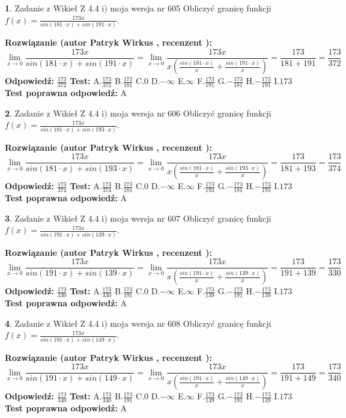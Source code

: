 \documentclass[12pt, a4paper]{article}
\theoremstyle{definition} %
\newtheorem{zad}{}
\newcommand{\zadStart}[1]{\begin{zad}#1\newline}
\newcommand{\zadStop}{\end{zad}}
\newcommand{\rozwStart}[2]{\noindent \textbf{Rozwiązanie (autor #1 , recenzent #2): }\newline}
\newcommand{\rozwStop}{\newline}
\newcommand{\odpStart}{\noindent \textbf{Odpowiedź:}\newline}
\newcommand{\odpStop}{\newline}
\newcommand{\testStart}{\noindent \textbf{Test:}\newline}
\newcommand{\testStop}{\newline}
\newcommand{\kluczStart}{\noindent \textbf{Test poprawna odpowiedź:}\newline}
\newcommand{\kluczStop}{\newline}
\begin{document}
\zadStart{Zadanie z Wikieł Z 4.4 i) moja wersja nr 605}
Obliczyć granicę funkcji $f(x)=\frac{173x}{sin(181\cdot x) +sin(191\cdot x)}$.
\zadStop
\rozwStart{Patryk Wirkus}{}
$$\lim\limits_{x\to 0}\frac{173x}{sin(181\cdot x) +sin(191\cdot x)}=\lim\limits_{x\to 0}\frac{173x}{x(\frac{sin(181\cdot x)}{x}+\frac{sin(191\cdot x)}{x})}=\frac{173}{181+191} = \frac{173}{372}$$
\rozwStop
\odpStart
$\frac{173}{372}$
\odpStop
\testStart
A.$\frac{173}{372}$
B.$\frac{173}{181}$
C.$0$
D.$-\infty$
E.$\infty$
F.$\frac{173}{191}$
G.$-\frac{173}{181}$
H.$-\frac{173}{191}$
I.$173$
\testStop
\kluczStart
A
\kluczStop



\zadStart{Zadanie z Wikieł Z 4.4 i) moja wersja nr 606}
Obliczyć granicę funkcji $f(x)=\frac{173x}{sin(181\cdot x) +sin(193\cdot x)}$.
\zadStop
\rozwStart{Patryk Wirkus}{}
$$\lim\limits_{x\to 0}\frac{173x}{sin(181\cdot x) +sin(193\cdot x)}=\lim\limits_{x\to 0}\frac{173x}{x(\frac{sin(181\cdot x)}{x}+\frac{sin(193\cdot x)}{x})}=\frac{173}{181+193} = \frac{173}{374}$$
\rozwStop
\odpStart
$\frac{173}{374}$
\odpStop
\testStart
A.$\frac{173}{374}$
B.$\frac{173}{181}$
C.$0$
D.$-\infty$
E.$\infty$
F.$\frac{173}{193}$
G.$-\frac{173}{181}$
H.$-\frac{173}{193}$
I.$173$
\testStop
\kluczStart
A
\kluczStop



\zadStart{Zadanie z Wikieł Z 4.4 i) moja wersja nr 607}
Obliczyć granicę funkcji $f(x)=\frac{173x}{sin(191\cdot x) +sin(139\cdot x)}$.
\zadStop
\rozwStart{Patryk Wirkus}{}
$$\lim\limits_{x\to 0}\frac{173x}{sin(191\cdot x) +sin(139\cdot x)}=\lim\limits_{x\to 0}\frac{173x}{x(\frac{sin(191\cdot x)}{x}+\frac{sin(139\cdot x)}{x})}=\frac{173}{191+139} = \frac{173}{330}$$
\rozwStop
\odpStart
$\frac{173}{330}$
\odpStop
\testStart
A.$\frac{173}{330}$
B.$\frac{173}{191}$
C.$0$
D.$-\infty$
E.$\infty$
F.$\frac{173}{139}$
G.$-\frac{173}{191}$
H.$-\frac{173}{139}$
I.$173$
\testStop
\kluczStart
A
\kluczStop



\zadStart{Zadanie z Wikieł Z 4.4 i) moja wersja nr 608}
Obliczyć granicę funkcji $f(x)=\frac{173x}{sin(191\cdot x) +sin(149\cdot x)}$.
\zadStop
\rozwStart{Patryk Wirkus}{}
$$\lim\limits_{x\to 0}\frac{173x}{sin(191\cdot x) +sin(149\cdot x)}=\lim\limits_{x\to 0}\frac{173x}{x(\frac{sin(191\cdot x)}{x}+\frac{sin(149\cdot x)}{x})}=\frac{173}{191+149} = \frac{173}{340}$$
\rozwStop
\odpStart
$\frac{173}{340}$
\odpStop
\testStart
A.$\frac{173}{340}$
B.$\frac{173}{191}$
C.$0$
D.$-\infty$
E.$\infty$
F.$\frac{173}{149}$
G.$-\frac{173}{191}$
H.$-\frac{173}{149}$
I.$173$
\testStop
\kluczStart
A
\kluczStop
\end{document}
